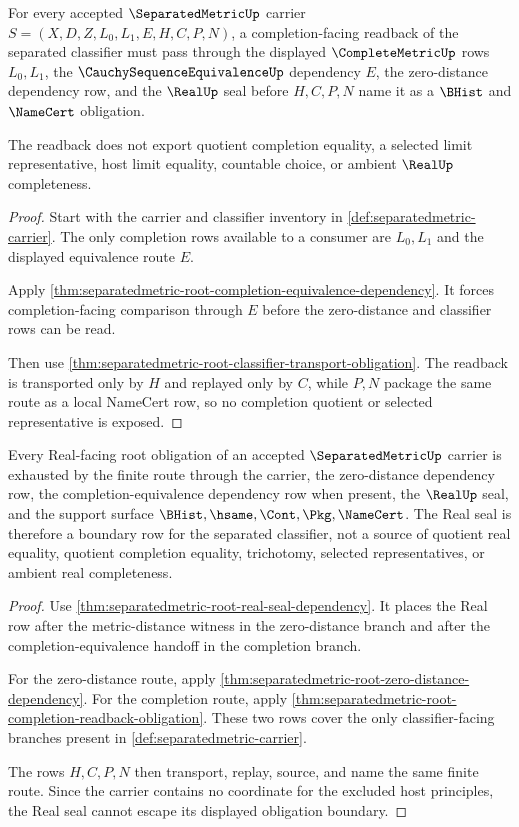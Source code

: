 \begin{theorem}
\label{thm:separatedmetric-root-completion-readback-obligation}
For every accepted $\SeparatedMetricUp$ carrier $S=(X,D,Z,L_0,L_1,E,H,C,P,N)$, a completion-facing readback of the separated classifier must pass through the displayed $\CompleteMetricUp$ rows $L_0,L_1$, the $\CauchySequenceEquivalenceUp$ dependency $E$, the zero-distance dependency row, and the $\RealUp$ seal before $H,C,P,N$ name it as a $\BHist$ and $\NameCert$ obligation.

The readback does not export quotient completion equality, a selected limit representative, host limit equality, countable choice, or ambient $\RealUp$ completeness.
\end{theorem}
\begin{proof}
Start with the carrier and classifier inventory in \autoref{def:separatedmetric-carrier}. The only completion rows available to a consumer are $L_0,L_1$ and the displayed equivalence route $E$.

Apply \autoref{thm:separatedmetric-root-completion-equivalence-dependency}. It forces completion-facing comparison through $E$ before the zero-distance and classifier rows can be read.

Then use \autoref{thm:separatedmetric-root-classifier-transport-obligation}. The readback is transported only by $H$ and replayed only by $C$, while $P,N$ package the same route as a local NameCert row, so no completion quotient or selected representative is exposed.
\end{proof}

\begin{theorem}
\label{thm:separatedmetric-root-real-seal-nonescape-obligation}
Every Real-facing root obligation of an accepted $\SeparatedMetricUp$ carrier is exhausted by the finite route through the carrier, the zero-distance dependency row, the completion-equivalence dependency row when present, the $\RealUp$ seal, and the support surface $\BHist,\hsame,\Cont,\Pkg,\NameCert$. The Real seal is therefore a boundary row for the separated classifier, not a source of quotient real equality, quotient completion equality, trichotomy, selected representatives, or ambient real completeness.
\end{theorem}
\begin{proof}
Use \autoref{thm:separatedmetric-root-real-seal-dependency}. It places the Real row after the metric-distance witness in the zero-distance branch and after the completion-equivalence handoff in the completion branch.

For the zero-distance route, apply \autoref{thm:separatedmetric-root-zero-distance-dependency}. For the completion route, apply \autoref{thm:separatedmetric-root-completion-readback-obligation}. These two rows cover the only classifier-facing branches present in \autoref{def:separatedmetric-carrier}.

The rows $H,C,P,N$ then transport, replay, source, and name the same finite route. Since the carrier contains no coordinate for the excluded host principles, the Real seal cannot escape its displayed obligation boundary.
\end{proof}

